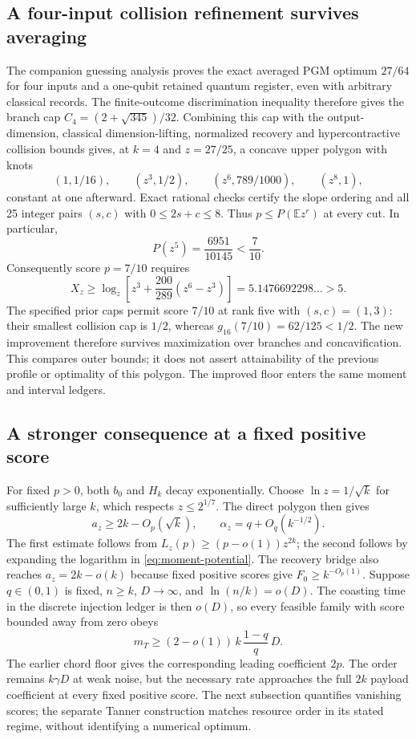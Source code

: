 \documentclass[11pt,a4paper]{article}
\numberwithin{equation}{section}
\theoremstyle{remark}\newtheorem*{remark}{Interpretation}
\newcommand{\E}{\mathbb E}
\begin{document}
\subsection{A four-input collision refinement survives averaging}
The companion guessing analysis proves the exact averaged PGM optimum $27/64$ for four inputs and a one-qubit retained quantum register, even with arbitrary classical records. The finite-outcome discrimination inequality therefore gives the branch cap
$C_4=(2+\sqrt{345})/32$. Combining this cap with the output-dimension, classical dimension-lifting, normalized recovery and hypercontractive collision bounds gives, at $k=4$ and $z=27/25$, a concave upper polygon with knots
\[
(1,1/16),\qquad(z^3,1/2),\qquad(z^6,789/1000),\qquad(z^8,1),
\]
constant at one afterward. Exact rational checks certify the slope ordering and all 25 integer pairs $(s,c)$ with $0\le2s+c\le8$. Thus $p\le P(\E z^r)$ at every cut. In particular,
\[
P(z^5)=\frac{6951}{10145}<\frac7{10}.
\]
Consequently score $p=7/10$ requires
\[
X_z\ge\log_z\!\left[z^3+\frac{200}{289}(z^6-z^3)\right]
=5.1476692298\ldots>5.
\]
The specified prior caps permit score $7/10$ at rank five with $(s,c)=(1,3)$: their smallest collision cap is $1/2$, whereas $g_{16}(7/10)=62/125<1/2$. The new improvement therefore survives maximization over branches and concavification. This compares outer bounds; it does not assert attainability of the previous profile or optimality of this polygon. The improved floor enters the same moment and interval ledgers.

\subsection{A stronger consequence at a fixed positive score}
For fixed $p>0$, both $b_0$ and $H_k$ decay exponentially. Choose $\ln z=1/\sqrt{k}$ for sufficiently large $k$, which respects $z\le2^{1/7}$. The direct polygon then gives
\[
a_z\ge2k-O_p(\sqrt{k}),\qquad
\alpha_z=q+O_q(k^{-1/2}).
\]
The first estimate follows from $L_z(p)\ge(p-o(1))z^{2k}$; the second follows by expanding the logarithm in \eqref{eq:moment-potential}. The recovery bridge also reaches $a_z=2k-o(k)$ because fixed positive scores give $F_0\ge k^{-O_p(1)}$. Suppose $q\in(0,1)$ is fixed, $n\ge k$, $D\to\infty$, and $\ln(n/k)=o(D)$. The coasting time in the discrete injection ledger is then $o(D)$, so every feasible family with score bounded away from zero obeys
\begin{equation}
m_T\ge(2-o(1))\,k\,\frac{1-q}{q}\,D.
\label{eq:moment-asymptotic}
\end{equation}
The earlier chord floor gives the corresponding leading coefficient $2p$. The order remains $k\gamma D$ at weak noise, but the necessary rate approaches the full $2k$ payload coefficient at every fixed positive score. The next subsection quantifies vanishing scores; the separate Tanner construction matches resource order in its stated regime, without identifying a numerical optimum.
\end{document}
